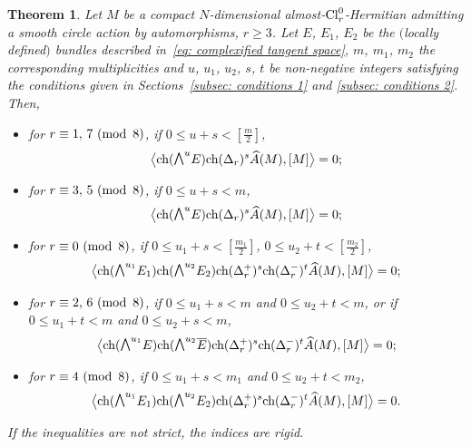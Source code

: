 \documentclass[10pt,a4paper]{amsart}
\newcommand{\A}{\mbox{$\widehat A$}}
\newcommand{\ext}{\raise1pt\hbox{$\textstyle\bigwedge$}}
\newcommand{\ch}{\mbox{\rm ch}}
\numberwithin{equation}{section}
\newtheorem{Theorem}{Theorem}[section]
\begin{document}
\begin{Theorem}\label{theo: vanishing 1} Let $M$ be a compact $N$-dimensional almost-${\rm Cl}_r^0$-Hermitian admitting a smooth circle action by automorphisms, $r\geq 3$. Let $E$, $E_1$, $E_2$ be the $($locally defined$)$ bundles described in~\eqref{eq: complexified tangent space}, $m$, $m_1$, $m_2$ the corresponding multiplicities and $u$, $u_1$, $u_2$, $s$, $t$ be non-negative integers satisfying the conditions given in Sections~{\rm \ref{subsec: conditions 1}} and {\rm \ref{subsec: conditions 2}}. Then,
\begin{itemize}\itemsep=0pt
\item for $r\equiv 1,\, 7 \,\,({\rm mod\,\,\,} 8)$, if $0\leq u+s<[\frac{m}{2}]$,
\begin{gather*}\big\langle \ch(\ext^u E)\ch(\Delta_r)^s\A(M),[M]\big\rangle =0;\end{gather*}

\item for $r\equiv 3,\, 5 \,\,({\rm mod\,\,\,} 8)$, if $0\leq u+s<m$,
 \begin{gather*}\big\langle \ch(\ext^u E)\ch(\Delta_r)^s\A(M),[M]\big\rangle =0;\end{gather*}

\item for $r\equiv 0 \,\,({\rm mod\,\,\,} 8)$, if $0\leq u_1+s<[\frac{m_1}{2}]$, $0\leq u_2+t<[\frac{m_2}{2}]$,
\begin{gather*}\big\langle \ch(\ext^{u_1} E_1)\ch(\ext^{u_2} E_2)\ch(\Delta_r^+)^{s}\ch(\Delta_r^-)^{t}\A(M),[M]\big\rangle =0;\end{gather*}

\item for $r\equiv 2,\, 6 \,\,({\rm mod\,\,\,} 8)$, if $0\leq u_1+s<m$ and $0 \leq u_2+t <m$, or if $0\leq u_1+t<m$ and $0 \leq u_2+s <m$,
\begin{gather*}\big\langle \ch(\ext^{u_1} E)\ch(\ext^{u_2} \overline{E})\ch(\Delta_r^+)^{s}\ch(\Delta_r^-)^{t}\A(M),[M]\big\rangle =0;\end{gather*}

\item for $r\equiv 4 \,\,({\rm mod\,\,\,} 8)$, if $0\leq u_1+s<m_1$ and $0\leq u_2+t<m_2$,
\begin{gather*}\big\langle \ch(\ext^{u_1} E_1)\ch(\ext^{u_2} E_2)\ch(\Delta_r^+)^{s}\ch(\Delta_r^-)^{t}\A(M),[M]\big\rangle =0.\end{gather*}
\end{itemize}
If the inequalities are not strict, the indices are rigid.
\end{Theorem}
\end{document}

